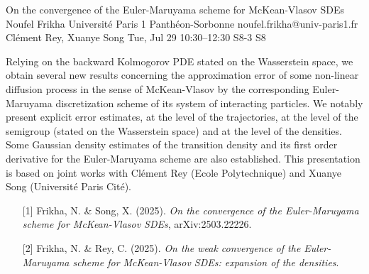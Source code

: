 \begin{talk}
  {On the convergence of the Euler-Maruyama scheme for McKean-Vlasov SDEs}%
  {Noufel Frikha}%
  {Universit\'e Paris 1 Panth\'eon-Sorbonne}%
  {noufel.frikha@univ-paris1.fr}%
  {Cl\'ement Rey, Xuanye Song}%
  {}%
  {Tue, Jul 29 10:30–12:30}%
  {S8-3}%
  {S8}%
  
				
			
Relying on the backward Kolmogorov PDE stated on the Wasserstein space, we obtain several new results concerning the approximation error of some non-linear diffusion process in the sense of McKean-Vlasov by the corresponding Euler-Maruyama discretization scheme of its system of interacting particles. We notably present explicit error estimates, at the level of the trajectories, at the level of the semigroup (stated on the Wasserstein space) and at the level of the densities. Some Gaussian density estimates of the transition density and its first order derivative for the Euler-Maruyama scheme are also established. This presentation is based on joint works with Cl\'ement Rey (Ecole Polytechnique) and Xuanye Song (Universit\'e Paris Cit\'e).

\medskip


\begin{enumerate}
	\item[{[1]}] Frikha, N.  \& Song, X. (2025). {\it On the convergence of the Euler-Maruyama scheme for McKean-Vlasov SDEs}, arXiv:2503.22226.
	\item[{[2]}] Frikha, N. \& Rey, C. (2025).  {\it On the weak convergence of the Euler-Maruyama scheme for McKean-Vlasov SDEs: expansion of the densities}.
\end{enumerate}


\end{talk}

